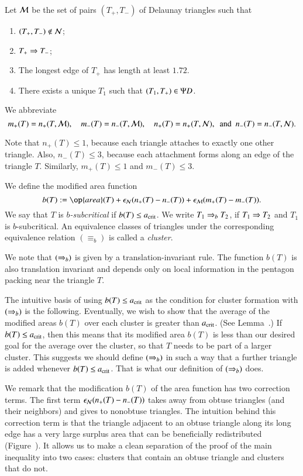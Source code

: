 Let $\mathcal M$ be the set of pairs $(T_+,T_-)$ of Delaunay triangles such that
\begin{enumerate}
\item $(T_+,T_-)\not\in \mathcal N$;
\item $T_+\Rightarrow T_-$;
\item The longest edge of $T_+$ has length  at least $1.72$.
\item There exists a unique $T_1$ such that $(T_1,T_+)\in \Psi D$.
\end{enumerate}

We abbreviate 
\[
m_+(T) = n_+(T,\M), 
\quad m_-(T) = n_-(T,\M), 
\quad n_+(T) =n_+(T,\N), 
\ \text{ and } \ 
n_-(T) = n_-(T,\N).
\]

\begin{remark}
  Note  that $n_+(T)\le 1$, because each triangle attaches to
  exactly one other triangle.  Also, $n_-(T)\le 3$, because each
  attachment forms along an edge of the triangle $T$.  Similarly,
  $m_+(T)\le 1$ and $m_-(T)\le 3$.
\end{remark}


We define the modified area function
\begin{equation}
b(T) := \op{area}(T) + \epsN (n_+(T) - n_-(T)) + \epsM (m_+(T) - m_-(T)).
\end{equation}
We say that $T$ is {\it $b$-subcritical} if $b(T) \le a_\text{crit}$.  We write
$T_1\Rightarrow_{b} T_2$, if $T_1\Rightarrow T_2$ and $T_1$ is $b$-subcritical.  An
equivalence classes of triangles under the corresponding equivalence
relation $(\equiv_b)$ is called a {\it cluster}.

We note that $(\Rightarrow_{b})$ is given by a translation-invariant rule.  The
function $b(T)$ is also translation invariant and depends only on
local information in the pentagon packing near the triangle $T$.

The intuitive basis of using $b(T)\le a_\text{crit}$ as the condition for
cluster formation with $(\Rightarrow_{b})$ is the following.  Eventually, we wish
to show that the average of the modified areas $b(T)$ over each
cluster is greater than $a_\text{crit}$.  (See Lemma~.)  If
$b(T)\le a_\text{crit}$, then this means that its modified area $b(T)$ is
less than our desired goal for the average over the cluster, so that
$T$ needs to be part of a larger cluster.  This suggests we should
define $(\Rightarrow_{b})$ in such a way that a further triangle is added
whenever $b(T)\le a_\text{crit}$. That is what our definition of $(\Rightarrow_{b})$
does.

We remark that the modification $b(T)$ of the area function has two
correction terms.  The first term $\epsilon_{\mathcal N} (n_+(T) - n_-(T))$ takes away
from obtuse triangles (and their neighbors) and gives to nonobtuse
triangles.  The intuition behind this correction term is that the
triangle adjacent to an obtuse triangle along its long edge has a very
large surplus area that can be beneficially redistributed
(Figure~).  It allows us to make a clean separation of
the proof of the main inequality into two cases: clusters that contain
an obtuse triangle and clusters that do not.

